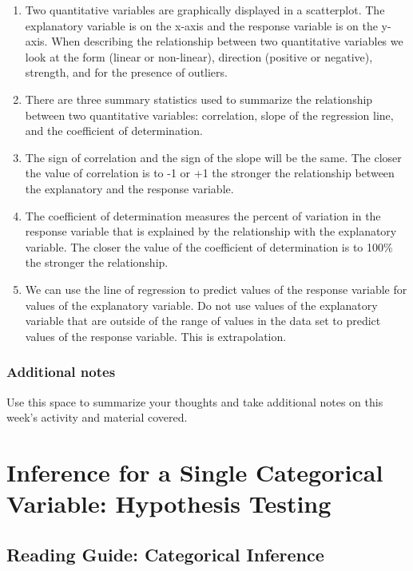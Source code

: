 \documentclass[
]{report}
\begin{document}
\begin{enumerate}
\def\labelenumi{\arabic{enumi}.}
\item
  Two quantitative variables are graphically displayed in a scatterplot. The explanatory variable is on the x-axis and the response variable is on the y-axis. When describing the relationship between two quantitative variables we look at the form (linear or non-linear), direction (positive or negative), strength, and for the presence of outliers.
\item
  There are three summary statistics used to summarize the relationship between two quantitative variables: correlation, slope of the regression line, and the coefficient of determination.
\item
  The sign of correlation and the sign of the slope will be the same. The closer the value of correlation is to -1 or +1 the stronger the relationship between the explanatory and the response variable.
\item
  The coefficient of determination measures the percent of variation in the response variable that is explained by the relationship with the explanatory variable. The closer the value of the coefficient of determination is to 100\% the stronger the relationship.
\item
  We can use the line of regression to predict values of the response variable for values of the explanatory variable. Do not use values of the explanatory variable that are outside of the range of values in the data set to predict values of the response variable. This is extrapolation.
\end{enumerate}

\hypertarget{additional-notes-4}{%
\subsection{Additional notes}\label{additional-notes-4}}

Use this space to summarize your thoughts and take additional notes on this week's activity and material covered.

\hypertarget{inference-for-a-single-categorical-variable-hypothesis-testing}{%
\chapter{Inference for a Single Categorical Variable: Hypothesis Testing}\label{inference-for-a-single-categorical-variable-hypothesis-testing}}

\hypertarget{reading-guide-categorical-inference}{%
\section{Reading Guide: Categorical Inference}\label{reading-guide-categorical-inference}}
\end{document}
